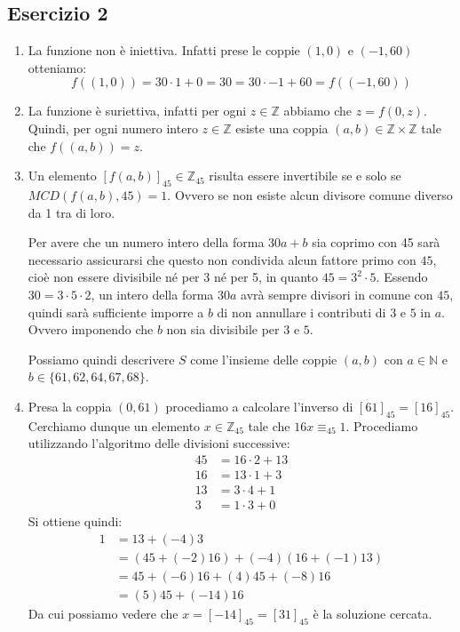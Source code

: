 \subsection*{Esercizio 2}
\begin{enumerate}[label=(\textit{\roman*})]
	\item La funzione non è iniettiva. Infatti prese le coppie $(1,0)$ e $(-1,60)$ otteniamo:
	\begin{displaymath}
		f((1,0)) = 30 \cdot 1 + 0 = 30 = 30 \cdot -1 + 60 = f((-1,60))
	\end{displaymath}
	\item La funzione è suriettiva, infatti per ogni $z \in \mathbb{Z}$ abbiamo che $z = f(0,z)$. Quindi, per ogni numero intero $z \in \mathbb{Z}$ esiste una coppia $(a,b) \in \mathbb{Z} \times \mathbb{Z}$ tale che $f((a,b))=z$.
	\item Un elemento $[f(a,b)]_{45} \in \mathbb{Z}_{45}$ risulta essere invertibile se e solo se $MCD(f(a,b),45)=1$. Ovvero se non esiste alcun divisore comune diverso da 1 tra di loro.
	
	Per avere che un numero intero della forma $30a+b$ sia coprimo con 45 sarà necessario assicurarsi che questo non condivida alcun fattore primo con $45$, cioè non essere divisibile né per 3 né per 5, in quanto $45=3^{2}\cdot 5$. Essendo $30=3 \cdot 5 \cdot 2$, un intero della forma $30a$ avrà sempre divisori in comune con $45$, quindi sarà sufficiente imporre a $b$ di non annullare i contributi di $3$ e $5$ in $a$. Ovvero imponendo che $b$ non sia divisibile per $3$ e $5$.
	
	Possiamo quindi descrivere $S$ come l'insieme delle coppie $(a,b)$ con $a \in \mathbb{N}$ e $b \in \{61,62,64,67,68\}$.
	\item Presa la coppia $(0,61)$ procediamo a calcolare l'inverso di $[61]_{45}=[16]_{45}$. Cerchiamo dunque un elemento $x \in \mathbb{Z}_{45}$ tale che $16x \equiv_{45} 1$. Procediamo utilizzando l'algoritmo delle divisioni successive:
	\begin{align*}
		45 &= 16 \cdot 2 + 13 \\
		16 &= 13 \cdot 1 + 3 \\
		13 &= 3 \cdot 4 + 1 \\
		3 &= 1 \cdot 3 + 0
	\end{align*}
Si ottiene quindi:
\begin{align*}
	1 &= 13 +(-4)3 \\
	&= (45 +(-2)16) + (-4)(16+(-1)13) \\
	&= 45 + (-6)16 +(4)45 + (-8)16 \\
	&= (5)45+(-14)16
\end{align*}
Da cui possiamo vedere che $x=[-14]_{45}=[31]_{45}$ è la soluzione cercata. 

\end{enumerate}
